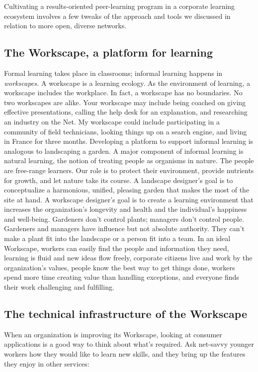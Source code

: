 Cultivating a results-oriented peer-learning program in a corporate
learning ecosystem involves a few tweaks of the approach and tools we
discussed in relation to more open, diverse networks.

\subsection{The Workscape, a platform for learning}

Formal learning takes place in classrooms; informal learning happens in
\emph{workscapes.} A workscape is a learning ecology. As the environment
of learning, a workscape includes the workplace. In fact, a workscape
has no boundaries. No two workscapes are alike. Your workscape may
include being coached on giving effective presentations, calling the
help desk for an explanation, and researching an industry on the Net. My
workscape could include participating in a community of field
technicians, looking things up on a search engine, and living in France
for three months. Developing a platform to support informal learning is
analogous to landscaping a garden. A major component of informal
learning is natural learning, the notion of treating people as organisms
in nature. The people are free-range learners. Our role is to protect
their environment, provide nutrients for growth, and let nature take its
course. A landscape designer's goal is to conceptualize a harmonious,
unified, pleasing garden that makes the most of the site at hand. A
workscape designer's goal is to create a learning environment that
increases the organization's longevity and health and the individual's
happiness and well-being. Gardeners don't control plants; managers don't
control people. Gardeners and managers have influence but not absolute
authority. They can't make a plant fit into the landscape or a person fit
into a team. In an ideal Workscape, workers can easily find the people
and information they need, learning is fluid and new ideas flow freely,
corporate citizens live and work by the organization's values, people
know the best way to get things done, workers spend more time creating
value than handling exceptions, and everyone finds their work
challenging and fulfilling.

\subsection{The technical infrastructure of the Workscape}

When an organization is improving its Workscape, looking at consumer
applications is a good way to think about what's required. Ask net-savvy
younger workers how they would like to learn new skills, and they bring
up the features they enjoy in other services:

